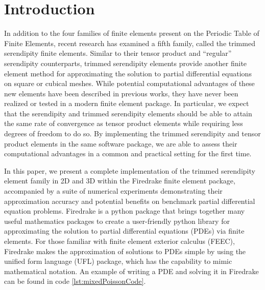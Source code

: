 \documentclass[manuscript,screen]{acmart}
\begin{document}
  
  \section{Introduction}
  
  In addition to the four families of finite elements present on the Periodic Table of Finite Elements, recent research has examined a fifth family, called the trimmed serendipity finite elements.  Similar to their tensor product and ``regular'' serendipity counterparts,  trimmed serendipity elements provide another finite element method for approximating the solution to partial differential equations on square or cubical meshes.  While potential computational advantages of these new elements have been described in previous works, they have never been realized or tested in a modern finite element package.  In particular, we expect that the serendipity and trimmed serendipity elements should be able to attain the same rate of convergence as tensor product elements while requiring less degrees of freedom to do so.  By implementing the trimmed serendipity and tensor product elements in the same software package, we are able to assess their computational advantages in a common and practical setting for the first time.
  
  
  In this paper, we present a complete implementation of the trimmed serendipity element family in 2D and 3D within the Firedrake finite element package, accompanied by a suite of numerical experiments demonstrating their approximation accuracy and potential benefits on benchmark partial differential equation problems.
Firedrake is a python package that brings together many useful mathematics packages to create a user-friendly python library for approximating the solution to partial differential equations (PDEs) via finite elements.  For those familiar with finite element exterior calculus (FEEC), Firedrake makes the approximation of solutions to PDEs simple by using the unified form language (UFL) package, which has the capability to mimic mathematical notation.  An example of writing a PDE and solving it in Firedrake can be found in code \ref{lst:mixedPoissonCode}.  
  
\end{document}
